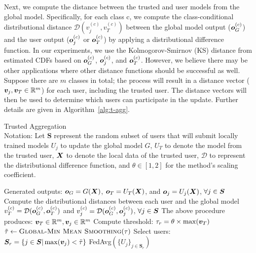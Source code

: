 \documentclass{article} %
\begin{document}
Next, we compute the distance between the trusted and user models from the global model. Specifically, for each class c, we compute the class-conditional distributional distance $\mathcal{D}(v^{(c)}_j, v^{(c)}_T)$ between the global model output (${\bm{o}}^{(c)}_G$) and the user output (${\bm{o}}^{(c)}_j$ or ${\bm{o}}^{(c)}_T$) by applying a distributional difference function. In our experiments, we use the Kolmogorov-Smirnov (KS) distance from estimated CDFs based on ${\bm{o}}^{(c)}_G$, ${\bm{o}}^{(c)}_j$, and ${\bm{o}}^{(c)}_T$. However, we believe there may be other applications where other distance functions should be successful as well. Suppose there are $m$ classes in total; the process will result in a distance vector (${\bm{v}}_j, {\bm{v}}_T\in{\mathbb{R}}^m$) for each user, including the trusted user. The distance vectors will then be used to determine which users can participate in the update. Further details are given in Algorithm~\ref{alg:t-agg}. 

\begin{algorithm}[H]
\caption{Trusted Aggregation \\ 
Notation: Let ${\bm S}$ represent the random subset of users that will submit locally trained models $U_j$ to update the global model $G$, $U_T$ to denote the model from the trusted user, ${\bm{X}}$ to denote the local data of the trusted user, $\mathcal{D}$ to represent the distributional difference function, and $\theta \in [1, 2]$ for the method's scaling coefficient.
}
\label{alg:t-agg}
\begin{algorithmic}[1]

        \State Generated outputs: ${\bm{o}}_G = G({\bm{X}})$, ${\bm{o}}_{T} = U_T({\bm{X}})$, and ${\bm{o}}_j = U_j({\bm{X}})$, $\forall j \in {\bm{S}}$
            \State Compute the distributional distances between each user and the global model
            \State \quad $v^{(c)}_T = \mathcal{D}({\bm{o}}^{(c)}_G, {\bm{o}}^{(c)}_T)$ and $v^{(c)}_{j} = \mathcal{D}({\bm{o}}^{(c)}_G, {\bm{o}}^{(c)}_{j})$, $\forall j \in {\bm{S}}$
        \EndFor
        \State The above procedure produces: ${\bm{v}}_T\in{\mathbb{R}}^m, {\bm{v}}_j\in{\mathbb{R}}^m$
        \State Compute threshold: $\tau_r = \theta \times\max ( {\bm{v}}_T )$
        \State  $\tilde{\tau} \gets \Call{Global-Min Mean Smoothing}{\tau}$  
        \State Select users: ${\bm{S}}_r = \{j \in {\bm{S}} | \max({\bm{v}}_{j}) < \tilde{\tau} \}$
        \State \Return FedAvg$(\{U_j\}_{j \in {\bm S}_r})$ 
    \EndProcedure
\end{algorithmic}
\end{algorithm}
\end{document}
